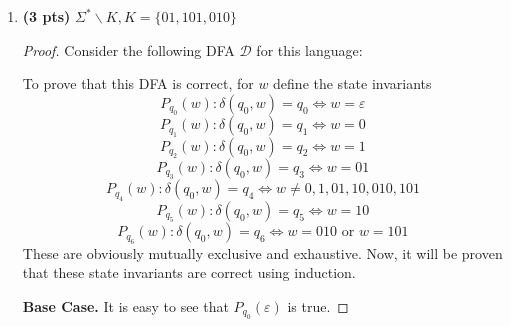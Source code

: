 \documentclass[11pt]{article}
\begin{document}
\begin{enumerate}[label=\textbf{Q\arabic*.}]
\begin{enumerate}[label=\textit{\alph*)}]
\begin{proof}
		A string that is not in \(\Sigma ^*\) cannot be found so the backwards direction is vacuously true.

		Therefore \(\mathcal{D}\) is correct.
		\smallbreak
	\end{proof}

	\item \textbf{(3 pts)} $ \Sigma^*\backslash K, K =\{01, 101, 010\}$
	
	\begin{proof}
		Consider the following DFA \(\mathcal{D}\) for this language:
		\begin{center}
		\end{center}
		To prove that this DFA is correct, for \(w\) define the state invariants
		\[
			P_{q_0}(w) : \delta (q_0, w) = q_0 \iff w = \varepsilon
		\]
		\[
			P_{q_1}(w) : \delta (q_0, w) = q_1 \iff w = 0
		\]
		\[
			P_{q_2}(w) : \delta (q_0, w) = q_2 \iff w = 1
		\]
		\[
			P_{q_3}(w) : \delta (q_0, w) = q_3 \iff w = 01
		\]
		\[
			P_{q_4}(w) : \delta (q_0, w) = q_4 \iff w \neq 0,1,01,10,010,101
		\]
		\[
			P_{q_5}(w) : \delta (q_0, w) = q_5 \iff w = 10
		\]
		\[
			P_{q_6}(w) : \delta (q_0, w) = q_6 \iff w = 010 \text{ or } w = 101
		\]
		These are obviously mutually exclusive and exhaustive. Now, it will be proven that these state invariants are correct using induction.

		\medskip

		\textbf{Base Case.} It is easy to see that \(P_{q_0}(\varepsilon)\) is true.

		\medskip


\end{proof}
\end{enumerate}
\end{enumerate}
\end{document}
